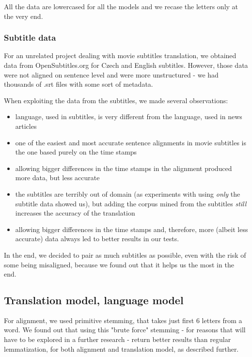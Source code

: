 \documentclass[11pt,letterpaper]{article}
\begin{document}
All the data are lowercased for all the models and we recase the letters only at the very end.

\subsubsection{Subtitle data}
For an unrelated project dealing with movie subtitles translation, we obtained data from OpenSubtitles.org for Czech and English subtitles. However, those data were not aligned on sentence level and were more unstructured - we had thousands of .srt files with some sort of metadata.

When exploiting the data from the subtitles, we made several observations:
\begin{itemize}
\item language, used in subtitles, is very different from the language, used in news articles%
\item one of the easiest and most accurate sentence alignments in movie subtitles is the one based purely on the time stamps
\item allowing bigger differences in the time stamps in the alignment produced more data, but less accurate
\item the subtitles are terribly out of domain (as experiments with using \emph{only} the subtitle data showed us), but adding the corpus mined from the subtitles \emph{still} increases the accuracy of the translation
\item allowing bigger differences in the time stamps and, therefore, more (albeit less accurate) data always led to better results in our tests.
\end{itemize}

In the end, we decided to pair as much subtitles as possible, even with the risk of some being misaligned, because we found out that it helps us the most in the end.


\subsection{Translation model, language model}
For alignment, we used primitive stemming, that takes just first 6 letters from a word. We found out that using this "brute force" stemming - for reasons that will have to be explored in a further research - return better results than regular lemmatization, for both alignment and translation model, as described further.
\end{document}
